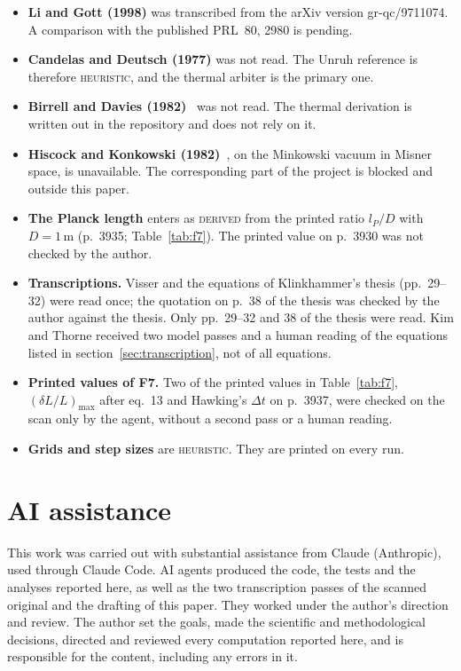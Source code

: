 \begin{itemize}
\item \textbf{Li and Gott (1998)} was transcribed from the arXiv version gr-qc/9711074. A comparison with the published PRL~80, 2980 is pending.
\item \textbf{Candelas and Deutsch (1977)} was not read. The Unruh reference is therefore \textsc{heuristic}, and the thermal arbiter is the primary one.
\item \textbf{Birrell and Davies (1982)}~\cite{birrell1982} was not read. The thermal derivation is written out in the repository and does not rely on it.
\item \textbf{Hiscock and Konkowski (1982)}~\cite{hiscock1982}, on the Minkowski vacuum in Misner space, is unavailable. The corresponding part of the project is blocked and outside this paper.
\item \textbf{The Planck length} enters as \textsc{derived} from the printed ratio $l_P/D$ with $D = 1$\,m (p.~3935; Table~\ref{tab:f7}). The printed value on p.~3930 was not checked by the author.
\item \textbf{Transcriptions.} Visser and the equations of Klinkhammer's thesis (pp.~29--32) were read once; the quotation on p.~38 of the thesis was checked by the author against the thesis. Only pp.~29--32 and 38 of the thesis were read. Kim and Thorne received two model passes and a human reading of the equations listed in section~\ref{sec:transcription}, not of all equations.
\item \textbf{Printed values of F7.} Two of the printed values in Table~\ref{tab:f7}, $(\delta L/L)_{\max}$ after eq.~13 and Hawking's $\Delta t$ on p.~3937, were checked on the scan only by the agent, without a second pass or a human reading.
\item \textbf{Grids and step sizes} are \textsc{heuristic}. They are printed on every run.
\end{itemize}

\section{AI assistance}

This work was carried out with substantial assistance from Claude (Anthropic), used through Claude Code. AI agents produced the code, the tests and the analyses reported here, as well as the two transcription passes of the scanned original and the drafting of this paper. They worked under the author's direction and review. The author set the goals, made the scientific and methodological decisions, directed and reviewed every computation reported here, and is responsible for the content, including any errors in it.

